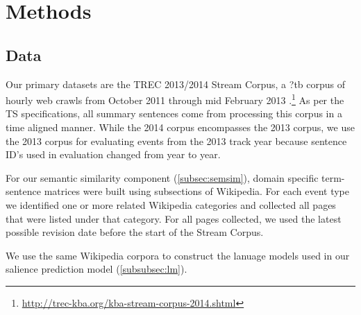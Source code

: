 
\section{Methods}

\subsection{Data}\label{sec:data}

Our primary datasets are the TREC 2013/2014 Stream Corpus, 
a ?tb corpus of hourly 
web crawls from October 2011
through mid February 2013 \cite{frank2012building}.\footnote{\url{http://trec-kba.org/kba-stream-corpus-2014.shtml}}
As per the TS specifications, all summary sentences come from processing this
corpus in a time aligned manner. While the 2014 corpus encompasses the 
2013 corpus, we use the 2013 corpus for evaluating events from the 2013 track
year because sentence ID's used in evaluation changed from year to year.

For our semantic similarity component (\cref{subsec:semsim}),
domain specific term-sentence matrices were built using subsections of
Wikipedia. For each event type we identified one or more related Wikipedia
categories and collected all pages that were listed under that category.
For all pages collected, we used the latest possible revision date before the
start of the Stream Corpus.

We use the same Wikipedia corpora to construct the lanuage models used
in our salience prediction model (\cref{subsubsec:lm}). 

